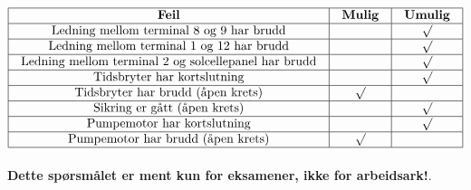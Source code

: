$$\vbox{\offinterlineskip
\halign{\strut
\vrule \quad\hfil # \ \hfil & 
\vrule \quad\hfil # \ \hfil & 
\vrule \quad\hfil # \ \hfil \vrule \cr
\noalign{\hrule}
%
{\bf Feil} & {\bf Mulig} & {\bf Umulig} \cr
%
\noalign{\hrule}
%
Ledning mellom terminal 8 og 9 har brudd &  & $\surd$ \cr
%
\noalign{\hrule}
%
Ledning mellom terminal 1 og 12 har brudd &  & $\surd$ \cr
%
\noalign{\hrule}
%
Ledning mellom terminal 2 og solcellepanel har brudd &  & $\surd$ \cr
%
\noalign{\hrule}
%
Tidsbryter har kortslutning &  & $\surd$ \cr
%
\noalign{\hrule}
%
Tidsbryter har brudd (åpen krets) & $\surd$ &  \cr
%
\noalign{\hrule}
%
Sikring er gått (åpen krets) &  & $\surd$ \cr
%
\noalign{\hrule}
%
Pumpemotor har kortslutning &  & $\surd$ \cr
%
\noalign{\hrule}
%
Pumpemotor har brudd (åpen krets) & $\surd$ &  \cr
%
\noalign{\hrule}
} %
}$$ %








{\bf Dette spørsmålet er ment kun for eksamener, ikke for arbeidsark!}.

